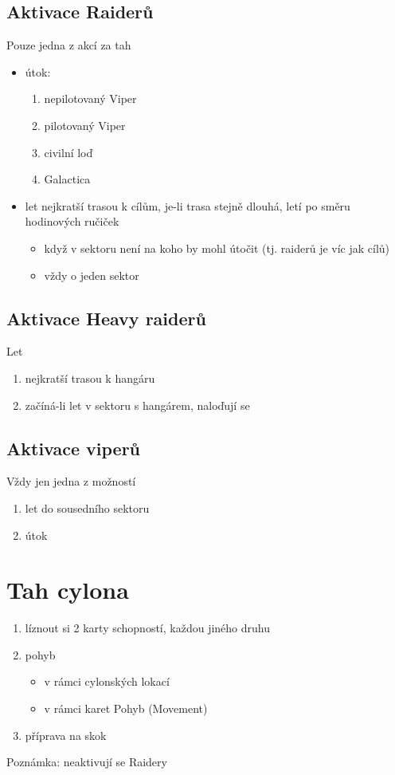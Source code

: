 \documentclass[a4paper,twocolumn]{article}
\begin{document}
\subsection{Aktivace Raiderů}
Pouze jedna z akcí za tah
\begin{itemize}
\item útok:
	\begin{enumerate}
	\item nepilotovaný Viper
	\item pilotovaný Viper
	\item civilní loď
	\item Galactica
	\end{enumerate}
\item let nejkratší trasou k cílům, je-li trasa stejně dlouhá, letí po směru hodinových ručiček
	\begin{itemize}
	\item když v sektoru není na koho by mohl útočit (tj. raiderů je víc jak cílů)
	\item vždy o jeden sektor
	\end{itemize}
\end{itemize}

\subsection{Aktivace Heavy raiderů}
Let
\begin{enumerate}
\item nejkratší trasou k hangáru
\item začíná-li let v sektoru s hangárem, naloďují se
\end{enumerate}

\subsection{Aktivace viperů}
Vždy jen jedna z možností
\begin{enumerate}
\item let do sousedního sektoru
\item útok
\end{enumerate}

\section{Tah cylona}
\begin{enumerate}
\item líznout si 2 karty schopností, každou jiného druhu
\item pohyb 
	\begin{itemize}
	\item v rámci cylonských lokací 
	\item v rámci karet Pohyb (Movement)
	\end{itemize}
\item příprava na skok
\end{enumerate}
Poznámka: neaktivují se Raidery
\end{document}
